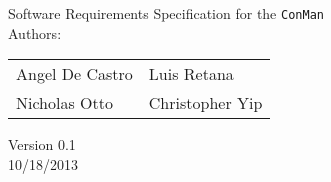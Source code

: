 \begin{titlepage}
\Huge
\vspace{2cm}
\begin{center}
Software Requirements Specification for the \texttt{ConMan}\\
\vspace{3cm}
\Large
Authors:\\ 

\begin{tabular}{l l}\hline
Angel De Castro & Luis Retana\\
Nicholas Otto   & Christopher Yip
\end{tabular}
\vspace{1cm}

Version 0.1\\
10/18/2013
\end{center}


\end{titlepage}
